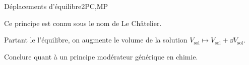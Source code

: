 \begin{exercise}{Déplacements d'équilibre}{2}{PC,MP}
\begin{questions}
\begin{parts}
        Ce principe est connu sous le nom de Le Châtelier.
    \end{parts}
    
    \question Partant le l'équilibre, on augmente le volume de la solution $V_\text{sol} \mapsto V_\text{sol} + \dd{V_\text{sol}}.$
        
    \question Conclure quant à un principe modérateur générique en chimie.
    
\end{questions}

\end{exercise}
